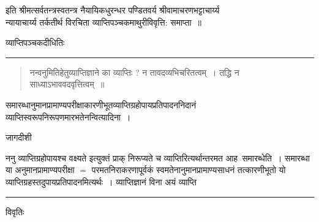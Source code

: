 \documentclass[10pt, openany]{book}
\begin{document}
{\begin{center}
इति
श्रीमत्सर्वतन्त्रस्वतन्त्र नैयायिकधुरन्धर पण्डितवर्य श्रीवामाचरणभट्टाचार्य्य\\
न्यायाचार्य्य  तर्कतीर्थ विरचिता व्याप्तिपञ्चकमाथुरीविवृत्ति: समाप्ता~॥
\end{center}
\newpage
\thispagestyle{empty}
\begin{center}
 \huge व्याप्तिपञ्चकदीधितिः     \\
 \rule{.2\linewidth}{1pt}
\end{center}
\begin{quote}
\vpc
नन्वनुमितिहेतुव्याप्तिज्ञाने का व्याप्तिः ? न तावदव्यभिचरितत्वम्~। तद्धि न साध्याऽभाववदवृत्तित्वम्~॥
\end{quote}

समारब्धानुमानप्रामाण्यपरीक्षाकारणीभूतव्याप्तिग्रहोपायप्रतिपादननिदानं व्याप्तिस्वरूपनिरूपणमारभतेनन्वित्यादिना~।
\begin{center} जागदीशी \end{center}

ननु {\qt व्याप्तिग्रहोपायश्च वक्ष्यते} इत्युक्तं प्राक् निरूप्यते च व्याप्तिरित्यर्थान्तरमत आह\textendash\ {\qt समारब्धेति}~। समारब्धा या अनुमानप्रामाण्यपरीक्षा $=$ परमतनिराकरणापूर्वकं स्वमतेनानुमानप्रामाण्यसाधनं तत्कारणीभूतो यो व्याप्तिग्रहस्तदुपायप्रतिपादनमित्यर्थः~। व्याप्तिज्ञानं विना {\qt अयं
व्याप्ति}\\
\hrule
\begin{center}     विवृतिः \end{center}

}
\end{document}
